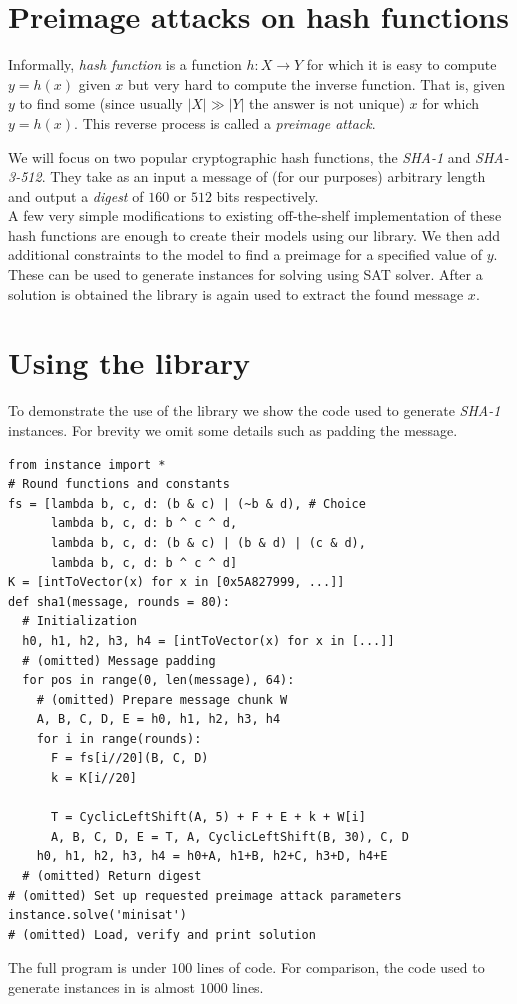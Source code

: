\documentclass[myposter,portrait]{sciposter}
\def\mysection#1{
{\color{sectionCol}\section*{\sc\bfseries #1}}}
\begin{document}
\begin{multicols*}{3}
\columnbreak
\mysection{Preimage attacks on hash functions}
Informally, \emph{hash function} is a function $h: X \to Y$ for which it is easy to compute $y = h(x)$ given $x$ but very hard to compute the inverse function.
That is, given $y$ to find some (since usually $|X| \gg |Y|$ the answer is not unique) $x$ for which $y = h(x)$.
This reverse process is called a \emph{preimage attack}.

We will focus on two popular cryptographic hash functions, the \emph{SHA-1} and \emph{SHA-3-512}.
They take as an input a message of (for our purposes) arbitrary length and output a \emph{digest} of $160$ or $512$ bits respectively.
~\\

A few very simple modifications to existing off-the-shelf implementation of these hash functions are enough to create their models using our library.
We then add additional constraints to the model to find a preimage for a specified value of $y$.
These can be used to generate instances for solving using SAT solver.
After a solution is obtained the library is again used to extract the found message $x$.

\mysection{Using the library}
To demonstrate the use of the library we show the code used to generate \emph{SHA-1} instances.
For brevity we omit some details such as padding the message.
\begin{verbatim}
from instance import *
# Round functions and constants
fs = [lambda b, c, d: (b & c) | (~b & d), # Choice
      lambda b, c, d: b ^ c ^ d,
      lambda b, c, d: (b & c) | (b & d) | (c & d),
      lambda b, c, d: b ^ c ^ d]
K = [intToVector(x) for x in [0x5A827999, ...]]
def sha1(message, rounds = 80):
  # Initialization
  h0, h1, h2, h3, h4 = [intToVector(x) for x in [...]]
  # (omitted) Message padding
  for pos in range(0, len(message), 64):
    # (omitted) Prepare message chunk W
    A, B, C, D, E = h0, h1, h2, h3, h4
    for i in range(rounds):
      F = fs[i//20](B, C, D)
      k = K[i//20]
      
      T = CyclicLeftShift(A, 5) + F + E + k + W[i]
      A, B, C, D, E = T, A, CyclicLeftShift(B, 30), C, D
    h0, h1, h2, h3, h4 = h0+A, h1+B, h2+C, h3+D, h4+E
  # (omitted) Return digest
# (omitted) Set up requested preimage attack parameters
instance.solve('minisat')
# (omitted) Load, verify and print solution
\end{verbatim}
The full program is under $100$ lines of code.
For comparison, the code used to generate instances in \cite{nossum2012sat} is almost $1000$ lines.



\end{multicols*}
\end{document}
